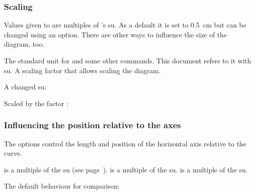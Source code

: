 \documentclass[load-preamble+]{cnltx-doc}
\begin{document}
\subsubsection{Scaling}

Values given to  are multiples of \ENdiagram's \ac{su}.  As a default
it is set to \SI{.5}{cm} but can be changed using an option.  There are other ways
to influence the size of the diagram, too.
\begin{options}
 \Default{.5cm}
   The standard unit for  and some other commands.  This document
   refers to it with \ac{su}. \label{key:unit}
   A scaling factor that allows scaling the diagram.
\end{options}

A changed \ac{su}:
\begin{example}
  \begin{endiagram}[unit=2em]
  \end{endiagram}
\end{example}

Scaled by the factor :
\begin{example}
  \begin{endiagram}[scale=1.5]
  \end{endiagram}
\end{example}

\subsubsection{Influencing the position relative to the axes}

The  options control the length and position of the horizontal
axis relative to the curve.
\begin{options}
     is a multiple of the \ac{su} (see page~\pageref{key:unit}).
     is a multiple of the \ac{su}.
     is a multiple of the \ac{su}.
\end{options}

The default behaviour for comparison:
\begin{example}
  \begin{endiagram}
  \end{endiagram}
\end{example}
\end{document}
